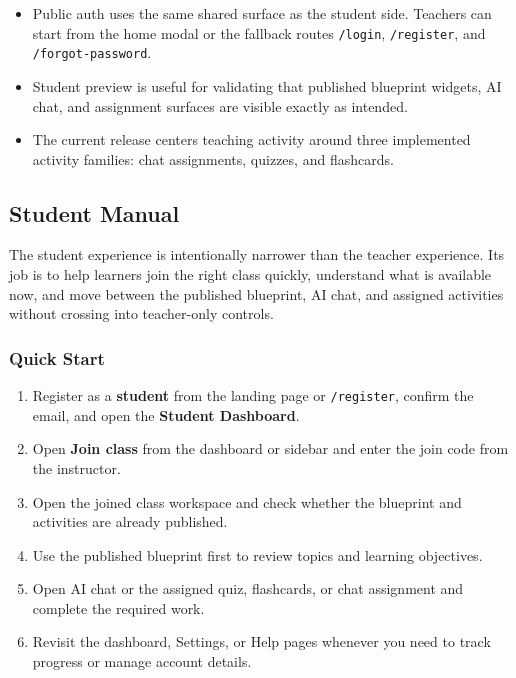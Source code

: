 \documentclass[11pt,a4paper]{article}
\begin{document}
\begin{itemize}
  \item Public auth uses the same shared surface as the student side. Teachers can start from the
  home modal or the fallback routes \texttt{/login}, \texttt{/register}, and
  \texttt{/forgot-password}.
  \item Student preview is useful for validating that published blueprint widgets, AI chat, and
  assignment surfaces are visible exactly as intended.
  \item The current release centers teaching activity around three implemented activity families:
  chat assignments, quizzes, and flashcards.
\end{itemize}

\subsection{Student Manual}

\noindent The student experience is intentionally narrower than the teacher experience. Its job is to
help learners join the right class quickly, understand what is available now, and move between the
published blueprint, AI chat, and assigned activities without crossing into teacher-only controls.

\subsubsection*{Quick Start}

\begin{enumerate}
  \item Register as a \textbf{student} from the landing page or \texttt{/register}, confirm the email,
  and open the \textbf{Student Dashboard}.
  \item Open \textbf{Join class} from the dashboard or sidebar and enter the join code from the
  instructor.
  \item Open the joined class workspace and check whether the blueprint and activities are already
  published.
  \item Use the published blueprint first to review topics and learning objectives.
  \item Open AI chat or the assigned quiz, flashcards, or chat assignment and complete the required
  work.
  \item Revisit the dashboard, Settings, or Help pages whenever you need to track progress or manage
  account details.
\end{enumerate}
\end{document}
